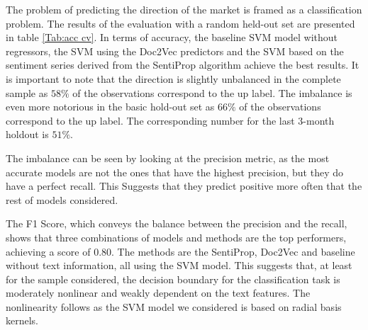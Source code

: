 \documentclass[a4paper, 12pt]{report}
\begin{document}
    The problem of predicting the direction of the market is framed as a classification problem. The results of the evaluation with a random held-out set are presented in table \ref{Tab:acc cv}. In terms of accuracy, the baseline SVM model without regressors, the SVM using the Doc2Vec predictors and the SVM based on the sentiment series derived from the SentiProp algorithm achieve the best results. It is important to note that the direction is slightly unbalanced in the complete sample as $58\%$ of the observations correspond to the up label. The imbalance is even more notorious in the basic hold-out set as $66\%$ of the observations correspond to the up label. The corresponding number for the last 3-month holdout is $51\%$. 
    
    The imbalance can be seen by looking at the precision metric, as the most accurate models are not the ones that have the highest precision, but they do have a perfect recall. This Suggests that they predict positive more often that the rest of models considered.  
    
    
    The F1 Score, which conveys the balance between the precision and the recall, shows that three combinations of models and methods are the top performers, achieving a score of $0.80$. The methods are the SentiProp, Doc2Vec and baseline without text information, all using the SVM model. This suggests that, at least for the sample considered, the decision boundary for the classification task is moderately nonlinear and weakly dependent on the text features. The nonlinearity follows as the SVM model we considered is based on radial basis kernels. 
    
    
\end{document}
